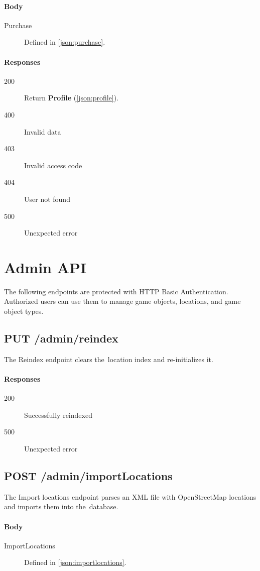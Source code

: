 		\paragraph*{Body}
			\begin{description}
				\item[Purchase] Defined in \ref{json:purchase}.
			\end{description}
		\paragraph*{Responses}
			\begin{description}		
				\item[200] Return \textbf{Profile} (\ref{json:profile}).
				\item[400] Invalid data
				\item[403] Invalid access code
				\item[404] User not found
				\item[500] Unexpected error
			\end{description}

\section{Admin API}
The following endpoints are protected with HTTP Basic Authentication. Authorized users can use them to manage game objects, locations, and game object types.

	\subsection{PUT /admin/reindex}
	The Reindex endpoint clears the~location index and re-initializes it.
		\paragraph*{Responses}
		\begin{description}		
			\item[200] Successfully reindexed
			\item[500] Unexpected error
		\end{description}

	\subsection{POST /admin/importLocations}
	The Import locations endpoint parses an XML file with OpenStreetMap locations and imports them into the~database.
		\paragraph*{Body}
			\begin{description}
				\item[ImportLocations] Defined in \ref{json:importlocations}.
			\end{description}
